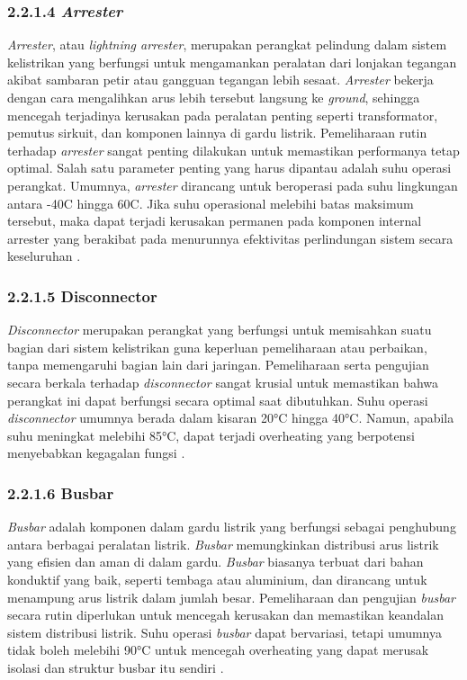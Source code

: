 \subsubsection{2.2.1.4 \emph{Arrester}}
\emph{Arrester}, atau \emph{lightning arrester}, merupakan perangkat pelindung dalam sistem kelistrikan yang berfungsi untuk mengamankan peralatan dari lonjakan tegangan akibat sambaran petir atau gangguan tegangan lebih sesaat. \emph{Arrester} bekerja dengan cara mengalihkan arus lebih tersebut langsung ke \emph{ground}, sehingga mencegah terjadinya kerusakan pada peralatan penting seperti transformator, pemutus sirkuit, dan komponen lainnya di gardu listrik. Pemeliharaan rutin terhadap \emph{arrester} sangat penting dilakukan untuk memastikan performanya tetap optimal. Salah satu parameter penting yang harus dipantau adalah suhu operasi perangkat. Umumnya, \emph{arrester} dirancang untuk beroperasi pada suhu lingkungan antara -40\textdegree{}C hingga 60\textdegree{}C. Jika suhu operasional melebihi batas maksimum tersebut, maka dapat terjadi kerusakan permanen pada komponen internal arrester yang berakibat pada menurunnya efektivitas perlindungan sistem secara keseluruhan \cite{Kartika2022}.

\subsubsection{2.2.1.5 Disconnector}
\emph{Disconnector} merupakan perangkat yang berfungsi untuk memisahkan suatu bagian dari sistem kelistrikan guna keperluan pemeliharaan atau perbaikan, tanpa memengaruhi bagian lain dari jaringan. Pemeliharaan serta pengujian secara berkala terhadap \emph{disconnector} sangat krusial untuk memastikan bahwa perangkat ini dapat berfungsi secara optimal saat dibutuhkan. Suhu operasi \emph{disconnector} umumnya berada dalam kisaran 20°C hingga 40°C. Namun, apabila suhu meningkat melebihi 85°C, dapat terjadi overheating yang berpotensi menyebabkan kegagalan fungsi \cite{Henriana2022}.


\subsubsection{2.2.1.6 Busbar}
\emph{Busbar} adalah komponen dalam gardu listrik yang berfungsi sebagai penghubung antara berbagai peralatan listrik. \emph{Busbar} memungkinkan distribusi arus listrik yang efisien dan aman di dalam gardu. \emph{Busbar} biasanya terbuat dari bahan konduktif yang baik, seperti tembaga atau aluminium, dan dirancang untuk menampung arus listrik dalam jumlah besar. Pemeliharaan dan pengujian \emph{busbar} secara rutin diperlukan untuk mencegah kerusakan dan memastikan keandalan sistem distribusi listrik. Suhu operasi \emph{busbar} dapat bervariasi, tetapi umumnya tidak boleh melebihi 90°C untuk mencegah overheating yang dapat merusak isolasi dan struktur busbar itu sendiri \cite{Telaumbanua2024}.


